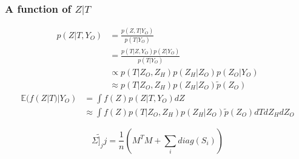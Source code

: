 \documentclass[11pt,a4paper]{article}
\newcommand{\Esp}{\mathds{E}}
\begin{document}
\subsubsection{A function of $Z|T$}
\begin{align*}
 p(Z|T,Y_O) &= \frac{p(Z,T|Y_O)}{p(T|Y_O)}\\
 &= \frac{p(T|Z,Y_O) p(Z|Y_O)}{p(T|Y_O)}\\
 & \propto p(T|Z_O,Z_H) p(Z_H|Z_O) p(Z_O|Y_O)\\
 &\approx  p(T|Z_O,Z_H) p(Z_H|Z_O)  \tilde{p}(Z_O) 
\end{align*}
\begin{align*}
\Esp(f(Z|T)|Y_O) &=\int f(Z) p(Z|T,Y_O) dZ\\
&\approx \int f(Z) p(T|Z_O,Z_H)p(Z_H|Z_O)\tilde{p}(Z_O) dT dZ_H dZ_O
\end{align*}

$$\tilde{\Sigma]_jj} = \frac{1}{n}(M^TM + \sum_i diag(S_i)) $$
\end{document}
